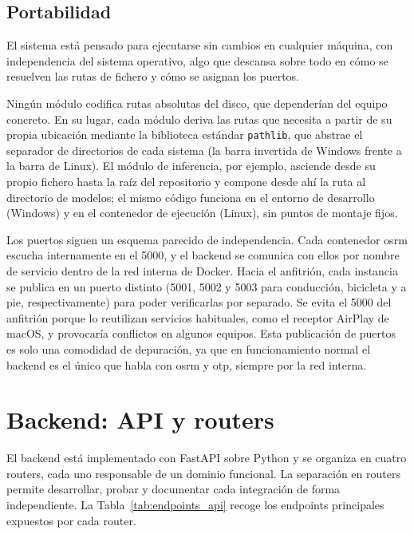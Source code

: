 \subsection{Portabilidad}

El sistema está pensado para ejecutarse sin cambios en cualquier máquina, con independencia del sistema operativo, algo que descansa sobre todo en cómo se resuelven las rutas de fichero y cómo se asignan los puertos.\newline

Ningún módulo codifica rutas absolutas del disco, que dependerían del equipo concreto. En su lugar, cada módulo deriva las rutas que necesita a partir de su propia ubicación mediante la biblioteca estándar \texttt{pathlib}, que abstrae el separador de directorios de cada sistema (la barra invertida de Windows frente a la barra de Linux). El módulo de inferencia, por ejemplo, asciende desde su propio fichero hasta la raíz del repositorio y compone desde ahí la ruta al directorio de modelos; el mismo código funciona en el entorno de desarrollo (Windows) y en el contenedor de ejecución (Linux), sin puntos de montaje fijos.\newline

Los puertos siguen un esquema parecido de independencia. Cada contenedor \gls{osrm} escucha internamente en el 5000, y el backend se comunica con ellos por nombre de servicio dentro de la red interna de Docker. Hacia el anfitrión, cada instancia se publica en un puerto distinto (5001, 5002 y 5003 para conducción, bicicleta y a pie, respectivamente) para poder verificarlas por separado. Se evita el 5000 del anfitrión porque lo reutilizan servicios habituales, como el receptor AirPlay de macOS, y provocaría conflictos en algunos equipos. Esta publicación de puertos es solo una comodidad de depuración, ya que en funcionamiento normal el backend es el único que habla con \gls{osrm} y \gls{otp}, siempre por la red interna.

\section{Backend: API y routers}
\label{sec:arch_backend}

El backend está implementado con FastAPI sobre Python y se organiza en cuatro routers, cada uno responsable de un dominio funcional. La separación en routers permite desarrollar, probar y documentar cada integración de forma independiente. La Tabla~\ref{tab:endpoints_api} recoge los endpoints principales expuestos por cada router.\newline

